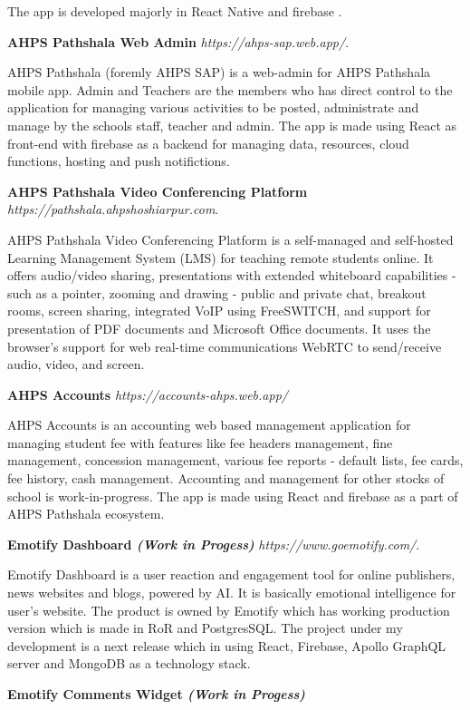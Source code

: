 \documentclass[margin,line]{res}
\begin{document}
\begin{resume}
The app is developed majorly in React Native and firebase .

\textbf{AHPS Pathshala Web Admin} {\em https://ahps-sap.web.app/}.

AHPS Pathshala (foremly AHPS SAP) is a web-admin for AHPS Pathshala mobile app. Admin and Teachers are the members who has direct control to the application for managing various activities to be posted, administrate and manage by the schools staff, teacher and admin. The app is made using React as front-end with firebase as a backend for managing data, resources, cloud functions, hosting and push notifictions.

\textbf{AHPS Pathshala Video Conferencing Platform} {\em https://pathshala.ahpshoshiarpur.com}.

AHPS Pathshala Video Conferencing Platform is a self-managed and self-hosted Learning Management System (LMS) for teaching remote students online.  It offers audio/video sharing, presentations with extended whiteboard capabilities - such as a pointer, zooming and drawing - public and private chat, breakout rooms, screen sharing, integrated VoIP using FreeSWITCH, and support for presentation of PDF documents and Microsoft Office documents. It uses the browser's support for web real-time communications WebRTC to send/receive audio, video, and screen. 

\textbf{AHPS Accounts} {\em https://accounts-ahps.web.app/}

AHPS Accounts is an accounting web based management application for managing student fee with features like fee headers management, fine management, concession management, various fee reports - default lists, fee cards, fee history, cash management. Accounting and management for other stocks of school is work-in-progress. The app is made using React and firebase as a part of AHPS Pathshala ecosystem.


\textbf{Emotify Dashboard \em (Work in Progess)} {\em https://www.goemotify.com/}. 

Emotify Dashboard is a user reaction and engagement tool for online publishers, news websites and blogs, powered by AI. It is basically emotional intelligence for user's website. The product is owned by Emotify which has working production version which is made in RoR and PostgresSQL. The project under my development is a next release which in using React, Firebase, Apollo GraphQL server and MongoDB as a technology stack.

\textbf{Emotify Comments Widget \em (Work in Progess)}


\end{resume}
\end{document}
